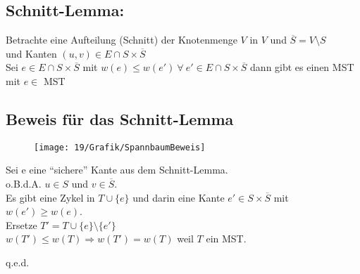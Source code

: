 \subsection{Schnitt-Lemma:}
Betrachte eine Aufteilung (Schnitt) der Knotenmenge $V$ in $V$ und $\overline{S} = V\setminus S$ \\und Kanten $(u,v) \in E \cap S\times \overline{S}$\\
Sei $e \in E \cap S \times \overline{S}$ mit $w(e) \leq w(e') ~\forall ~e' \in E \cap S\times \overline{S}$ dann gibt es einen MST mit $e \in$ MST
\subsection{Beweis für das Schnitt-Lemma}
\begin{figure}[h]
\centering
\texttt{[image: 19/Grafik/SpannbaumBeweis]}
\caption{}
\label{fig:SpannbaumBeweis}
\end{figure}

Sei e eine "`sichere"' Kante aus dem Schnitt-Lemma.\\
o.B.d.A. $u\in S$ und $v \in \overline{S}$.\\
Es gibt eine Zykel in $T\cup \{e\}$ und darin eine Kante $e'\in S\times \overline{S}$ mit $w(e') \geq w(e)$.\\
Ersetze $T'=T\cup\{e\}\setminus\{ e' \}$\\
$w(T') \leq w(T) \Rightarrow w(T') = w(T)$ weil $T$ ein MST.
\begin{flushright}
	q.e.d.
\end{flushright}
